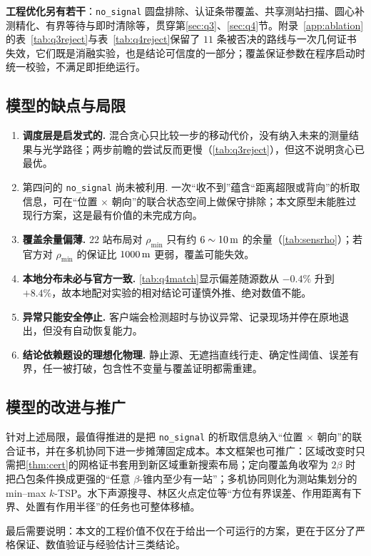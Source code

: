 \textbf{工程优化另有若干}：\texttt{no\_signal} 圆盘排除、认证条带覆盖、共享测站扫描、圆心补测精化、有界等待与即时清除等，贯穿第\ref{sec:q3}、\ref{sec:q4}节。附录~\ref{app:ablation}的表~\ref{tab:q3reject}与表~\ref{tab:q4reject}保留了 $11$ 条被否决的路线与一次几何证书失效，它们既是消融实验，也是结论可信度的一部分；覆盖保证参数在程序启动时统一校验，不满足即拒绝运行。

\subsection{模型的缺点与局限}

\begin{enumerate}[label=(\arabic*),itemsep=1pt]
  \item \textbf{调度层是启发式的.} 混合贪心只比较一步的移动代价，没有纳入未来的测量结果与光学路径；两步前瞻的尝试反而更慢（\cref{tab:q3reject}），但这不说明贪心已最优。
  \item 第四问的 \texttt{no\_signal} 尚未被利用. 一次“收不到”蕴含“距离超限或背向”的析取信息，可在“位置 $\times$ 朝向”的联合状态空间上做保守排除；本文原型未能胜过现行方案，这是最有价值的未完成方向。
  \item \textbf{覆盖余量偏薄.} $22$ 站布局对 $\rho_{\min}$ 只有约 $6\sim10\,\mathrm{m}$ 的余量（\cref{tab:sensrho}）；若官方对 $\rho_{\min}$ 的保证比 $1000\,\mathrm{m}$ 更弱，覆盖可能失效。
  \item \textbf{本地分布未必与官方一致.} \cref{tab:q4match}显示偏差随源数从 $-0.4\%$ 升到 $+8.4\%$，故本地配对实验的相对结论可谨慎外推、绝对数值不能。
  \item \textbf{异常只能安全停止.} 客户端会检测超时与协议异常、记录现场并停在原地退出，但没有自动恢复能力。
  \item \textbf{结论依赖题设的理想化物理.} 静止源、无遮挡直线行走、确定性阈值、误差有界，任一被打破，包含性不变量与覆盖证明都需重建。
\end{enumerate}

\subsection{模型的改进与推广}

针对上述局限，最值得推进的是把 \texttt{no\_signal} 的析取信息纳入“位置 $\times$ 朝向”的联合证书，并在多机协同下进一步摊薄固定成本。本文框架也可推广：区域改变时只需把\cref{thm:cert}的网格证书套用到新区域重新搜索布局；定向覆盖角收窄为 $2\beta$ 时把凸包条件换成更强的“任意 $\beta$-锥内至少有一站”；多机协同则化为测站集划分的 min--max $k$-TSP。水下声源搜寻、林区火点定位等“方位有界误差、作用距离有下界、处置有作用半径”的任务也可整体移植。

最后需要说明：本文的工程价值不仅在于给出一个可运行的方案，更在于区分了严格保证、数值验证与经验估计三类结论。
